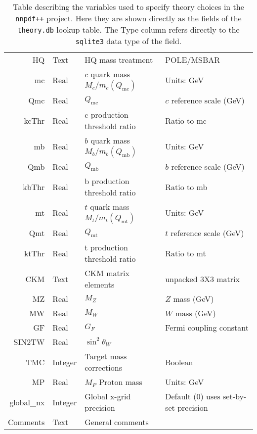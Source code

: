 \documentclass[11pt]{article}
\begin{document}
\begin{table}[htp]
\begin{center}
\begin{tabular}{|r|l|l|p{50mm}|}
  HQ        & Text    & HQ mass treatment              & POLE/MSBAR \\
  mc        & Real    & $c$ quark mass $M_c/m_c(Q_{\mathrm{mc}})$   & Units: GeV \\
  Qmc       & Real    & $Q_{\mathrm{mc}}$ & $c$ reference scale (GeV)\\
  kcThr     & Real    & c production threshold ratio & Ratio to mc\\
  mb        & Real    & $b$ quark mass $M_b/m_b(Q_{\mathrm{mb}})$   & Units: GeV \\
  Qmb       & Real    & $Q_{\mathrm{mb}}$ & $b$ reference scale (GeV)\\
  kbThr     & Real    & b production threshold ratio & Ratio to mb\\
  mt        & Real    & $t$ quark mass $M_t/m_t(Q_{\mathrm{mt}})$   & Units: GeV \\
  Qmt       & Real    & $Q_{\mathrm{mt}}$ & $t$ reference scale (GeV)\\
  ktThr     & Real    & t production threshold ratio & Ratio to mt\\
  CKM       & Text    & CKM matrix elements & unpacked 3X3 matrix \\ \pagebreak
  MZ        & Real    & $M_Z$                          & $Z$ mass (GeV) \\
  MW        & Real    & $M_W$                          & $W$ mass (GeV) \\
  GF        & Real    & $G_F$                          & Fermi coupling constant \\
  SIN2TW    & Real    & $\sin^2\theta_W$               & \\
  TMC       & Integer & Target mass corrections        & Boolean \\
  MP        & Real    & $M_P$ Proton mass              & Units: GeV \\
  global\_nx & Integer    & Global x-grid precision    & Default (0) uses
  set-by-set precision \\
  Comments  & Text    & General comments               & \\
\hline
\end{tabular}
\caption{Table describing the variables used to specify theory choices in the {\tt nnpdf++} project. Here they are shown directly as the fields of the {\tt theory.db} lookup table. The Type column refers directly to the {\tt sqlite3} data type of the field.}\label{tab:theoryparams}
\end{center}
\end{table}%
\end{document}
